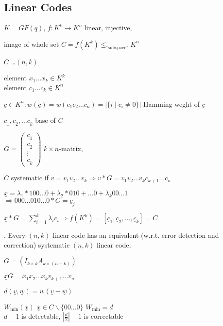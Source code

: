 \subsection{Linear Codes}
\begin{definition}
  $K = GF(q)$, $f:K^k \rightarrow K^n$ linear, injective,

  image of whole set $C = f(K^k) \leq_{\text{"subspace"}} K^n$

  $C$ \ldots $(n,k)$ 

  element $x_1\ldots x_k \in K^k$\\
  element $c_1\ldots c_k \in K^n$

  $\underline{c} \in K^n: w(\underline{c}) = w(c_1c_2 \ldots c_n) = |\{i \mid c_i \neq 0 \}|$ Hamming weght of $\underline{c}$

  $\underline{c}_1, \underline{c}_2, \ldots \underline{c}_k$ base of $C$

$G = \begin{pmatrix}\underline{c}_1\\ \underline{c}_2\\ \vdots \\ \underline{c}_k \end{pmatrix}$ $k\times n$-matrix, 

  $C$ systematic if $v = v_1v_2 \ldots v_k \Rightarrow v*G = v_1v_2 \ldots v_kc_{k+1}\ldots c_n$

  $\underline{x} = \lambda_1 * 100 \ldots 0 + \lambda_2 * 010 + \ldots 0 + \lambda_k 00\ldots 1$ \\
  $\Rightarrow 000\ldots 010 \ldots 0 * G = \underline{c}_j$

  $\underline{x}*G = \sum_{i=1}^k \lambda_i c_i \Rightarrow f(K^k) = [\underline{c}_1, \underline{c}_2, \ldots, \underline{c}_k ] = C$
\end{definition}

\Theorem.
Every $(n,k)$ linear code has an equivalent (w.r.t. error detection and correction) systematic $(n,k)$ linear code, 

$G = (I_{k\times k} A_{k\times (n-k)})$

$\underline{x} G = x_1 x_2 \ldots x_k v_{k+1} \ldots v_n$

$d(\underline{v}, \underline{w}) = w(\underline{v}-\underline{w})$

$W_{\min}(\underline{x})$ $\underline{x} \in C \backslash \{00\ldots 0\}$ $W_{\min} = d$ \\
$d-1$ is detectable, $ \left|\frac{d}{2}\right| -1$ is correctable


